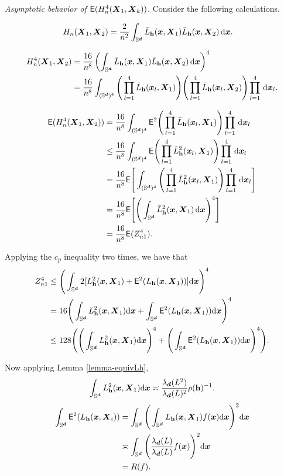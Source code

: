 \documentclass{article}
\begin{document}
\textit{Asymptotic behavior of $\mathsf{E} (H_n^4(\bX_1, \bX_k))$.} Consider the following calculations.

\begin{align*}
    H_n(\bX_1, \bX_2) &= \frac{2}{n^2} \int_{\Sr} \bar{L}_{\bh} (\bx,\bX_1) \bar{L}_{\bh} (\bx,\bX_2) \,\rd \bx.
\end{align*}

\begin{align*}
    H_n^4(\bX_1, \bX_2) &= \frac{16}{n^{8}} \lrp{\int_{\Sr} \bar{L}_{\bh} (\bx,\bX_1) \bar{L}_{\bh} (\bx,\bX_2) \,\rd \bx}^4\\
    &=\frac{16}{n^{8}}\int_{(\Sr)^4} \Bigg( \prod_{l=1}^{4} \bar{L}_{\bh} (\bx_l,\bX_1) \Bigg) \Bigg( \prod_{l=1}^{4} \bar{L}_{\bh} (\bx_l,\bX_2) \Bigg) \prod_{l=1}^{4} \,\rd 
    \bx_l.
\end{align*}

\begin{align*}
    \mathsf{E} (H_n^4(\bX_1, \bX_2)) &= \frac{16}{n^{8}} \int_{(\Sr)^4} \mathsf{E}^2 \Bigg( \prod_{l=1}^{4} \bar{L}_{\bh} (\bx_l,\bX_1) \Bigg) \prod_{l=1}^{4} \,\rd 
    \bx_l \\
    & \le \frac{16}{n^{8}} \int_{(\Sr)^4} \mathsf{E} \Bigg( \prod_{l=1}^{4} \bar{L}_{\bh}^2 (\bx_l,\bX_1) \Bigg) \prod_{l=1}^{4} \,\rd \bx_l \\
    &= \frac{16}{n^{8}} \mathsf{E} \Bigg[ \int_{(\Sr)^4} \Bigg( \prod_{l=1}^{4} \bar{L}_{\bh}^2 (\bx_l,\bX_1) \Bigg) \prod_{l=1}^{4} \,\rd \bx_l \Bigg] \\
    &= \frac{16}{n^{8}} \mathsf{E} \Bigg[ \Bigg( \int_{\Sr} \bar{L}_{\bh}^2 (\bx,\bX_1) \,\rd \bx \Bigg)^4 \Bigg] \\
    &= \frac{16}{n^{8}} \mathsf{E} (Z_{n1}^4).
\end{align*}

Applying the $c_p$ inequality two times, we have that
\begin{align*}
    Z_{n1}^4 & \le \Bigg( \int_{\Sr} 2[L_{\bh}^2 (\bx,\bX_1) + \mathsf{E}^2 (L_{\bh} (\bx,\bX_1))] \rd \bx \Bigg)^4 \\
    &= 16 \Bigg( \int_{\Sr} L_{\bh}^2 (\bx,\bX_1) \rd \bx + \int_{\Sr} \mathsf{E}^2 (L_{\bh} (\bx,\bX_1)) \rd \bx \Bigg)^4 \\
    & \le 128 \Bigg( \Bigg( \int_{\Sr} L_{\bh}^2 (\bx,\bX_1) \rd \bx \Bigg)^4 + \Bigg( \int_{\Sr} \mathsf{E}^2 (L_{\bh} (\bx,\bX_1)) \rd \bx \Bigg)^4 \Bigg).
\end{align*}

Now applying Lemma \ref{lemma-equivLh}, 
\begin{align*}
    \int_{\Sr} L_{\bh}^2 (\bx,\bX_1) \rd \bx \asymp \frac{\lambda_{\bd}(L^2)}{\lambda_{\bd}(L)^2} \rho(\bh)^{-1}.
\end{align*}
\begin{align*}
    \int_{\Sr} \mathsf{E}^2 (L_{\bh} (\bx,\bX_i)) &= \int_{\Sr} \Bigg( \int_{\Sr} L_{\bh} (\bx,\bX_1) f(\bx) \rd \bx \Bigg)^2 \rd \bx \\
    & \asymp \int_{\Sr} \Bigg( \frac{\lambda_{\bd}(L)}{\lambda_{\bd}(L)} f(\bx) \Bigg)^2 \rd \bx \\
    &= R(f).
\end{align*}
\end{document}
